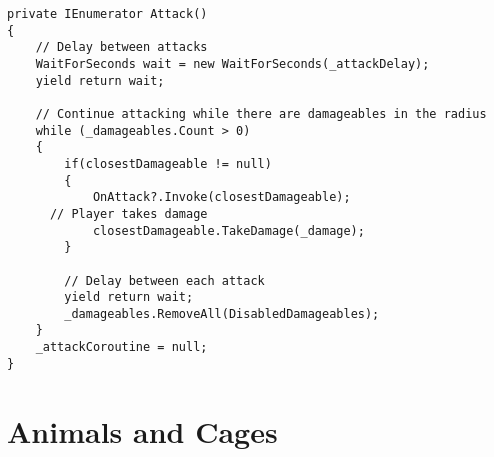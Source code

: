 \documentclass[]{final_report}
\begin{document}
\begin{verbatim}
private IEnumerator Attack()
{
    // Delay between attacks
    WaitForSeconds wait = new WaitForSeconds(_attackDelay);
    yield return wait;

    // Continue attacking while there are damageables in the radius
    while (_damageables.Count > 0)
    {
        if(closestDamageable != null)
        {
            OnAttack?.Invoke(closestDamageable);
	  // Player takes damage
            closestDamageable.TakeDamage(_damage);
        }

        // Delay between each attack
        yield return wait;
        _damageables.RemoveAll(DisabledDamageables);
    }
    _attackCoroutine = null;
}
\end{verbatim}
\section{Animals and Cages}
\end{document}
